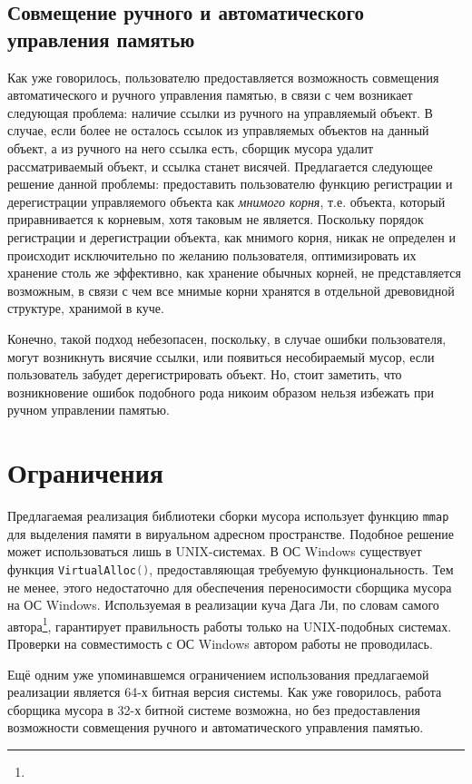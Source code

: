 \subsection{Совмещение ручного и автоматического управления памятью}

Как уже говорилось, пользователю предоставляется возможность совмещения автоматического и ручного управления памятью,
в связи с чем возникает следующая проблема: наличие ссылки из ручного на управляемый объект.
В случае, если более не осталось ссылок из управляемых объектов на данный объект, а из ручного на него ссылка есть,
сборщик мусора удалит рассматриваемый объект, и ссылка станет висячей.
Предлагается следующее решение данной проблемы: предоставить пользователю функцию регистрации и дерегистрации управляемого объекта
как \textit{мнимого корня}, т.е. объекта, который приравнивается к корневым, хотя таковым не является.
Поскольку порядок регистрации и дерегистрации объекта, как мнимого корня, никак не определен и происходит исключительно по 
желанию пользователя, оптимизировать их хранение столь же эффективно, как хранение обычных корней, не представляется возможным,
в связи с чем все мнимые корни хранятся в отдельной древовидной структуре, хранимой в куче.

Конечно, такой подход небезопасен, поскольку, в случае ошибки пользователя, могут возникнуть висячие ссылки, или появиться 
несобираемый мусор, если пользователь забудет дерегистрировать объект.
Но, стоит заметить, что возникновение ошибок подобного рода никоим образом нельзя избежать при ручном управлении памятью.

\section{Ограничения}

Предлагаемая реализация библиотеки сборки мусора использует функцию \lstinline[language= cpp]{mmap} для выделения памяти в
вируальном адресном пространстве. Подобное решение может использоваться лишь в UNIX-системах.
В ОС Windows существует функция \lstinline[language= cpp]{VirtualAlloc()}, предоставляющая требуемую функциональность.
Тем не менее, этого недостаточно для обеспечения переносимости сборщика мусора на ОС Windows.
Используемая в реализации куча Дага Ли, по словам самого автора\footnote{},
гарантирует правильность работы только на UNIX-подобных системах.
Проверки на совместимость с ОС Windows автором работы не проводилась.

Ещё одним уже упоминавшемся ограничением использования предлагаемой реализации является 64-х битная версия системы.
Как уже говорилось, работа сборщика мусора в 32-х битной системе возможна, но без предоставления возможности
совмещения ручного и автоматического управления памятью.

